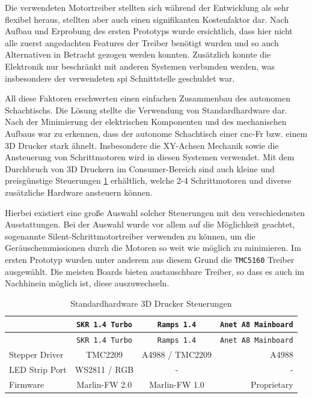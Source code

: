 Die verwendeten Motortreiber stellten sich während der Entwicklung als
sehr flexibel heraus, stellten aber auch einen signifikanten
Kostenfaktor dar. Nach Aufbau und Erprobung des ersten Prototyps wurde
ersichtlich, dass hier nicht alle zuerst angedachten Features der
Treiber benötigt wurden und so auch Alternativen in Betracht gezogen
werden konnten. Zusätzlich konnte die Elektronik nur beschränkt mit
anderen Systemen verbunden werden, was insbesondere der verwendeten
\gls{spi} Schnittstelle geschuldet war.

All diese Faktoren erschwerten einen einfachen Zusammenbau des autonomen
Schachtischs. Die Lösung stellte die Verwendung von Standardhardware
dar. Nach der Minimierung der elektrischen Komponenten und des
mechanischen Aufbaus war zu erkennen, dass der autonome Schachtisch
einer \gls{cnc}-Fr bzw. einem 3D Drucker stark ähnelt. Insbesondere die
XY-Achsen Mechanik sowie die Ansteuerung von Schrittmotoren wird in
diesen Systemen verwendet. Mit dem Durchbruch von 3D Druckern im
Consumer-Bereich sind auch kleine und preisgünstige Steuerungen
\ref{3dmarlinctl} erhältlich, welche 2-4 Schrittmotoren und diverse
zusätzliche Hardware ansteuern können.

Hierbei existiert eine große Auswahl solcher Steuerungen mit den
verschiedensten Ausstattungen. Bei der Auswahl wurde vor allem auf die
Möglichkeit geachtet, sogenannte Silent-Schrittmotortreiber verwenden zu
können, um die Geräuschemmissionen durch die Motoren so weit wie möglich
zu minimieren. Im ersten Prototyp wurden unter anderem aus diesem Grund
die \passthrough{\lstinline!TMC5160!} Treiber ausgewählt. Die meisten
Boards \label{3dmarlinctl} bieten austauschbare Treiber, so dass es auch
im Nachhinein möglich ist, diese auszuwechseln.

\begin{longtable}[]{@{}lccr@{}}
\caption{Standardhardware 3D Drucker Steuerungen
\label{3dmarlinctl}}\tabularnewline
\toprule
& \passthrough{\lstinline!SKR 1.4 Turbo!} &
\passthrough{\lstinline!Ramps 1.4!} &
\passthrough{\lstinline!Anet A8 Mainboard!}\tabularnewline
\midrule
\endfirsthead
\toprule
& \passthrough{\lstinline!SKR 1.4 Turbo!} &
\passthrough{\lstinline!Ramps 1.4!} &
\passthrough{\lstinline!Anet A8 Mainboard!}\tabularnewline
\midrule
\endhead
Stepper Driver & TMC2209 & A4988 / TMC2209 & A4988\tabularnewline
LED Strip Port & WS2811 / RGB & - & -\tabularnewline
Firmware & Marlin-FW 2.0 & Marlin-FW 1.0 & Proprietary\tabularnewline
\bottomrule
\end{longtable}

